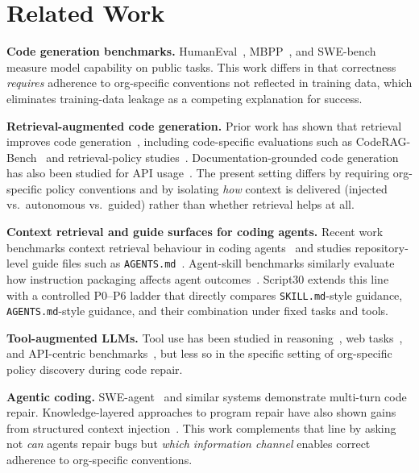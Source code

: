 \documentclass[10pt,conference]{IEEEtran}
\begin{document}
\section{Related Work}
\label{sec:related-work}

\textbf{Code generation benchmarks.}
HumanEval~\cite{chen2021evaluating}, MBPP~\cite{austin2021program}, and SWE-bench~\cite{jimenez2024swebench} measure model capability on public tasks.
This work differs in that correctness \emph{requires} adherence to org-specific conventions not reflected in training data, which eliminates training-data leakage as a competing explanation for success.

\textbf{Retrieval-augmented code generation.}
Prior work has shown that retrieval improves code generation~\cite{lewis2020retrieval}, including code-specific evaluations such as CodeRAG-Bench~\cite{wang2024coderagbench} and retrieval-policy studies~\cite{gu2025whattoretrieve}.
Documentation-grounded code generation has also been studied for API usage~\cite{chen2025apidocrag}.
The present setting differs by requiring org-specific policy conventions and by isolating \emph{how} context is delivered (injected vs.\ autonomous vs.\ guided) rather than whether retrieval helps at all.

\textbf{Context retrieval and guide surfaces for coding agents.}
Recent work benchmarks context retrieval behaviour in coding agents~\cite{cai2026contextbench} and studies repository-level guide files such as \texttt{AGENTS.md}~\cite{gloaguen2026agentsmd}.
Agent-skill benchmarks similarly evaluate how instruction packaging affects agent outcomes~\cite{li2026skillsbench}.
Script30 extends this line with a controlled P0--P6 ladder that directly compares \texttt{SKILL.md}-style guidance, \texttt{AGENTS.md}-style guidance, and their combination under fixed tasks and tools.

\textbf{Tool-augmented LLMs.}
Tool use has been studied in reasoning~\cite{schick2023toolformer}, web tasks~\cite{yao2023react}, and API-centric benchmarks~\cite{li2023apibank}, but less so in the specific setting of org-specific policy discovery during code repair.

\textbf{Agentic coding.}
SWE-agent~\cite{yang2024sweagent} and similar systems demonstrate multi-turn code repair.
Knowledge-layered approaches to program repair have also shown gains from structured context injection~\cite{ehsani2025hierarchical}.
This work complements that line by asking not \emph{can} agents repair bugs but \emph{which information channel} enables correct adherence to org-specific conventions.
\end{document}
